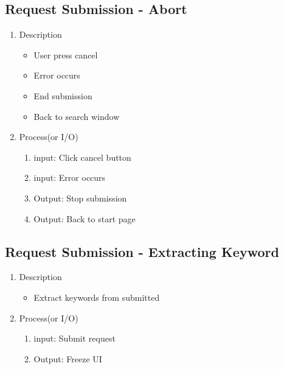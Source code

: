 \documentclass[conference]{IEEEtran}
\begin{document}
\begin{itemize}
\begin{itemize}
\begin{itemize}
\begin{itemize}
\subsection{Request Submission - Abort}
\begin{enumerate}
\item Description
   \begin{itemize}
  \item User press cancel
  \item Error occurs
  \item End submission
  \item Back to search window 
\end{itemize}
\item Process(or I/O)
  \begin{enumerate}
     \item input: Click cancel button
     \item input: Error occurs 
     \item Output: Stop submission
     \item Output: Back to start page
  \end{enumerate}
\end{enumerate}
\textit{}

\subsection{Request Submission - Extracting Keyword}
\begin{enumerate}
\item Description
\begin{itemize}
  \item Extract keywords from submitted  
\end{itemize}
\item Process(or I/O)
  \begin{enumerate}
     \item input: Submit request 
     \item Output: Freeze UI
  \end{enumerate}
\end{enumerate}
\textit{}


\end{itemize}
\end{itemize}
\end{itemize}
\end{itemize}
\end{document}
